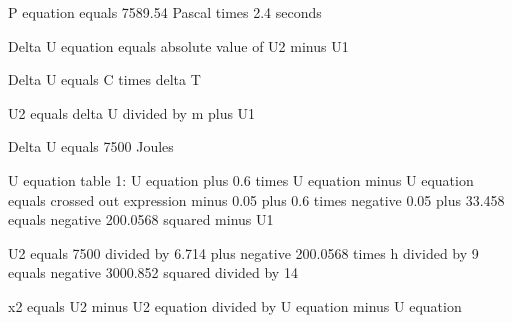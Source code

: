 P equation equals 7589.54 Pascal times 2.4 seconds

Delta U equation equals absolute value of U2 minus U1

Delta U equals C times delta T

U2 equals delta U divided by m plus U1

Delta U equals 7500 Joules

U equation table 1: U equation plus 0.6 times U equation minus U equation equals crossed out expression minus 0.05 plus 0.6 times negative 0.05 plus 33.458 equals negative 200.0568 squared minus U1

U2 equals 7500 divided by 6.714 plus negative 200.0568 times h divided by 9 equals negative 3000.852 squared divided by 14

x2 equals U2 minus U2 equation divided by U equation minus U equation